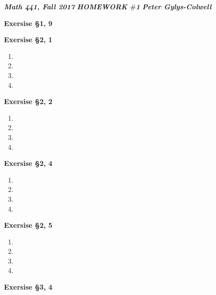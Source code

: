 \documentclass[12pt]{article}
\newcounter{ques}[section]
\newenvironment{ques}[1]{\textbf{Exersise #1} \vspace{1mm}}{\medskip}
\theoremstyle{definition}
\begin{document}
\noindent \textit{\textbf{Math 441, Fall 2017}} \hspace{1.3cm}
\textit{\textbf{HOMEWORK $\#$1}} \hspace{1.3cm} \textit{\textbf{Peter
Gylys-Colwell}} 

\vspace{1cm}

\begin{ques}{\S 1, 9}
	

\end{ques}

\begin{ques}{\S 2, 1}
	\begin{enumerate}
		\item

		\item

		\item

		\item

	\end{enumerate}
\end{ques}

\begin{ques}{\S 2, 2}
	\begin{enumerate}
		\item

		\item

		\item

		\item

	\end{enumerate}
\end{ques}

\begin{ques}{\S 2, 4}
	\begin{enumerate}
		\item

		\item

		\item

		\item

	\end{enumerate}
\end{ques}

\begin{ques}{\S 2, 5}
	\begin{enumerate}
		\item

		\item

		\item

		\item

	\end{enumerate}
\end{ques}

\begin{ques}{\S 3, 4}
\end{ques}
\end{document}
